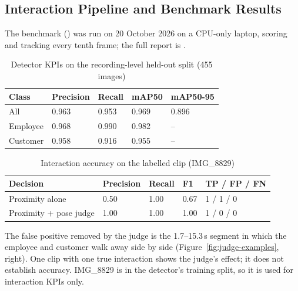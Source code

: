 \subsection{Interaction Pipeline and Benchmark Results}
The benchmark () was run on 20 October 2026 on a CPU-only laptop, scoring and tracking every tenth frame; the full report is .

\begin{table}[H]
\centering
\caption{Detector KPIs on the recording-level held-out split (455 images)}
\label{tab:detector-kpi}
\begin{tabular}{P{0.2\textwidth}P{0.14\textwidth}P{0.14\textwidth}P{0.14\textwidth}P{0.16\textwidth}}
\toprule
Class & Precision & Recall & mAP50 & mAP50-95\\
\midrule
All & 0.963 & 0.953 & 0.969 & 0.896\\
Employee & 0.968 & 0.990 & 0.982 & --\\
Customer & 0.958 & 0.916 & 0.955 & --\\
\bottomrule
\end{tabular}
\end{table}

\begin{table}[H]
\centering
\caption{Interaction accuracy on the labelled clip (IMG\_8829)}
\label{tab:interaction-kpi}
\begin{tabular}{P{0.26\textwidth}P{0.13\textwidth}P{0.13\textwidth}P{0.1\textwidth}P{0.2\textwidth}}
\toprule
Decision & Precision & Recall & F1 & TP / FP / FN\\
\midrule
Proximity alone & 0.50 & 1.00 & 0.67 & 1 / 1 / 0\\
Proximity + pose judge & 1.00 & 1.00 & 1.00 & 1 / 0 / 0\\
\bottomrule
\end{tabular}
\end{table}
The false positive removed by the judge is the 1.7--15.3\,s segment in which the employee and customer walk away side by side (Figure~\ref{fig:judge-examples}, right). One clip with one true interaction shows the judge's effect; it does not establish accuracy. IMG\_8829 is in the detector's training split, so it is used for interaction KPIs only.

